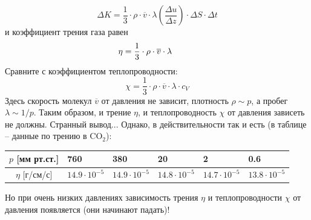 \begin{displaymath}
\Delta K =
\frac13\cdot\rho\cdot\overline{v}\cdot\lambda\left(\frac{\Delta u}{\Delta z}\right)\cdot\Delta S\cdot\Delta t
\end{displaymath}
и коэффициент трения газа равен
\begin{equation}\label{Eq.eta}
\eta=\frac13\cdot\rho\cdot\overline{v}\cdot\lambda\hspace{10mm}
\end{equation}
Сравните с коэффициентом теплопроводности:
\begin{equation}\label{Eq.chi}
\chi=\frac13\cdot\rho\cdot\overline{v}\cdot\lambda\cdot c_V
\end{equation}
Здесь скорость молекул $\overline{v}$ от давления не зависит, плотность $\rho\sim p$, а пробег $\lambda\sim1/p$. Таким образом, и трение $\eta$, и теплопроводность $\chi$ от давления зависеть не должны. Странный вывод... Однако, в действитель\-но\-с\-ти так и есть (в таблице -- данные по трению в CO$_2$):
\begin{center}
\begin{tabular}{|c||p{25mm}|p{25mm}|p{25mm}|p{25mm}|p{25mm}|}\hline
$p$ [мм рт.ст.] & 760  & 380  & 20 & 2 & 0.6 \\ \hline \hline
$\eta$ [г/см/с] &
$14.9\cdot10^{-5}$&
$14.9\cdot10^{-5}$&
$14.8\cdot10^{-5}$&
$14.7\cdot10^{-5}$&
$13.8\cdot10^{-5}$ \\ \hline
\end{tabular}
\end{center}
Но при очень низких давлениях зависимость трения $\eta$ и теплопроводности $\chi$ от давления появляется (они начинают падать)! \\
